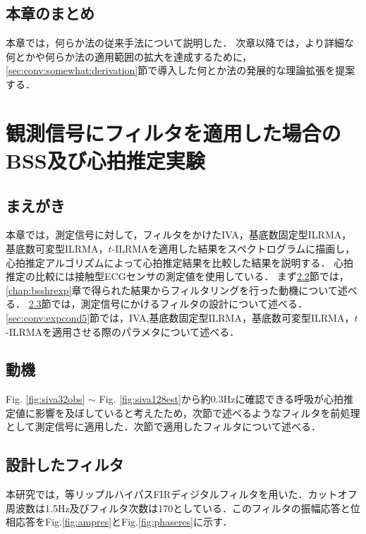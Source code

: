 \section{本章のまとめ}
本章では，何らか法の従来手法について説明した．
次章以降では，より詳細な何とかや何らか法の適用範囲の拡大を達成するために，
\ref{sec:conv:somewhat:derivation}節で導入した何とか法の発展的な理論拡張を提案する．


\chapter{観測信号にフィルタを適用した場合のBSS及び心拍推定実験}
\label{chap:conv}

\section{まえがき}
本章では，測定信号に対して，フィルタをかけたIVA，基底数固定型ILRMA，基底数可変型ILRMA，$t$-ILRMAを適用した結果をスペクトログラムに描画し，心拍推定アルゴリズムによって心拍推定結果を比較した結果を説明する．
心拍推定の比較には接触型ECGセンサの測定値を使用している．
まず\ref{sec:conv:motivation}節では，\ref{chap:bsshrexp}章で得られた結果からフィルタリングを行った動機について述べる．
\ref{sec:conv:filteroutline}節では，測定信号にかけるフィルタの設計について述べる．
\ref{sec:conv:expcond5}節では，IVA,基底数固定型ILRMA，基底数可変型ILRMA，$t$-ILRMAを適用させる際のパラメタについて述べる．

\section{動機}
\label{sec:conv:motivation}
Fig. \ref{fig:siva32obs} $\sim$ Fig. \ref{fig:siva128est}から約0.3Hzに確認できる呼吸が心拍推定値に影響を及ぼしていると考えたため，次節で述べるようなフィルタを前処理として測定信号に適用した．次節で適用したフィルタについて述べる．

\section{設計したフィルタ}
\label{sec:conv:filteroutline}
本研究では，等リップルハイパスFIRディジタルフィルタを用いた．カットオフ周波数は1.5Hz及びフィルタ次数は170としている．このフィルタの振幅応答と位相応答をFig.\ref{fig:ampres}とFig.\ref{fig:phaseres}に示す．

